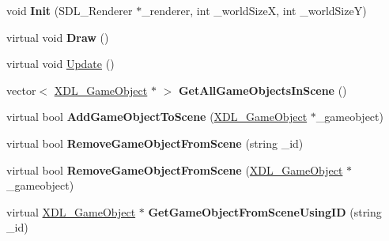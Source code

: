 \begin{DoxyCompactItemize}
\item 
\hypertarget{class_x_d_l___scene_aef26b7d953a74c407e029ac5b4003e96}{void {\bfseries Init} (S\-D\-L\-\_\-\-Renderer $\ast$\-\_\-renderer, int \-\_\-world\-Size\-X, int \-\_\-world\-Size\-Y)}\label{class_x_d_l___scene_aef26b7d953a74c407e029ac5b4003e96}

\item 
\hypertarget{class_x_d_l___scene_a1a3d1b1f6a4f1f4c0834cc1fe29af814}{virtual void {\bfseries Draw} ()}\label{class_x_d_l___scene_a1a3d1b1f6a4f1f4c0834cc1fe29af814}

\item 
virtual void \hyperlink{class_x_d_l___scene_abd1ce8f1dbc90c4376c99ccd7fd9c024}{Update} ()
\item 
\hypertarget{class_x_d_l___scene_aef613b01d6e162e8df21ca2e6a3850ba}{vector$<$ \hyperlink{class_x_d_l___game_object}{X\-D\-L\-\_\-\-Game\-Object} $\ast$ $>$ {\bfseries Get\-All\-Game\-Objects\-In\-Scene} ()}\label{class_x_d_l___scene_aef613b01d6e162e8df21ca2e6a3850ba}

\item 
\hypertarget{class_x_d_l___scene_a5776979310dd25abec878d33998b9b00}{virtual bool {\bfseries Add\-Game\-Object\-To\-Scene} (\hyperlink{class_x_d_l___game_object}{X\-D\-L\-\_\-\-Game\-Object} $\ast$\-\_\-gameobject)}\label{class_x_d_l___scene_a5776979310dd25abec878d33998b9b00}

\item 
\hypertarget{class_x_d_l___scene_aa8aea6a87c3dbd2faa52480907f90d62}{virtual bool {\bfseries Remove\-Game\-Object\-From\-Scene} (string \-\_\-id)}\label{class_x_d_l___scene_aa8aea6a87c3dbd2faa52480907f90d62}

\item 
\hypertarget{class_x_d_l___scene_ab040547e3b87e059c4efab4cde45031b}{virtual bool {\bfseries Remove\-Game\-Object\-From\-Scene} (\hyperlink{class_x_d_l___game_object}{X\-D\-L\-\_\-\-Game\-Object} $\ast$\-\_\-gameobject)}\label{class_x_d_l___scene_ab040547e3b87e059c4efab4cde45031b}

\item 
\hypertarget{class_x_d_l___scene_a542233e544b861b4e41b7ab86a91e122}{virtual \hyperlink{class_x_d_l___game_object}{X\-D\-L\-\_\-\-Game\-Object} $\ast$ {\bfseries Get\-Game\-Object\-From\-Scene\-Using\-I\-D} (string \-\_\-id)}\label{class_x_d_l___scene_a542233e544b861b4e41b7ab86a91e122}

\end{DoxyCompactItemize}
